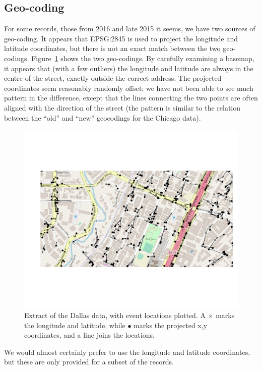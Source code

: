 \documentclass[twoside,a4paper,twocolumn,10pt]{article}
\theoremstyle{plain}
\theoremstyle{definition}
\begin{document}
\subsection{Geo-coding}

For some records, those from 2016 and late 2015 it seems, we have two sources of geo-coding.  It appears that
EPSG:2845 is used to project the longitude and latitude coordinates, but there is not an exact match
between the two geo-codings.  Figure~\ref{fig:dallas_geocoding} shows the two geo-codings.  By
carefully examining a basemap, it appears that (with a few outliers) the longitude and latitude
are always in the centre of the street, exactly outside the correct address.  The projected coordinates
seem reasonably randomly offset; we have not been able to see much pattern in the difference, except
that the lines connecting the two points are often aligned with the direction of the street (the
pattern is similar to the relation between the ``old'' and ``new'' geocodings for the Chicago data).

\begin{figure}
  \includegraphics[width=\textwidth]{dallas_geocoding_1.png}
  \caption{Extract of the Dallas data, with event locations plotted.  A $\times$ marks the longitude
and latitude, while $\bullet$ marks the projected x,y coordinates, and a line joins the locations.}
  \label{fig:dallas_geocoding}
\end{figure}

We would almost certainly prefer to use the longitude and latitude coordinates, but these are only
provided for a subset of the records.
\end{document}
